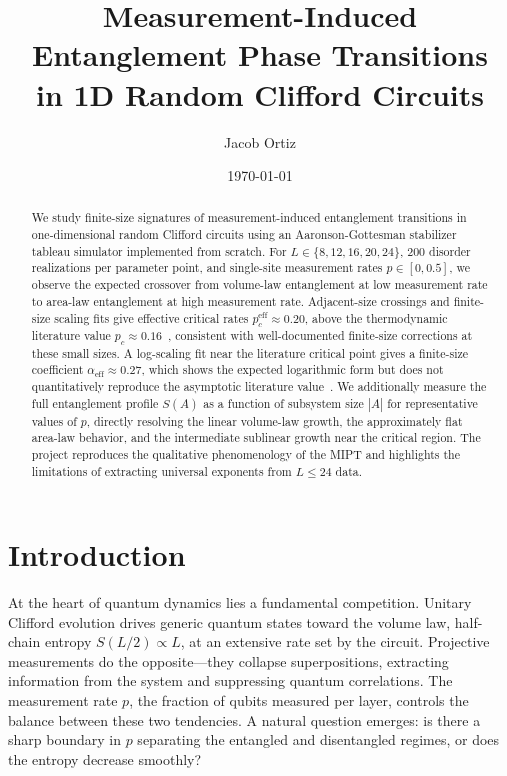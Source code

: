 \documentclass[twocolumn,prl,aps,floatfix]{revtex4-2}
\begin{document}
\title{Measurement-Induced Entanglement Phase Transitions\\
       in 1D Random Clifford Circuits}
\author{Jacob Ortiz}
\date{\today}

\begin{abstract}
We study finite-size signatures of measurement-induced entanglement transitions
in one-dimensional random Clifford circuits using an Aaronson-Gottesman
stabilizer tableau simulator implemented from scratch.
For $L \in \{8,12,16,20,24\}$, 200 disorder realizations per parameter point,
and single-site measurement rates $p \in [0, 0.5]$, we observe the expected
crossover from volume-law entanglement at low measurement rate to area-law
entanglement at high measurement rate.
Adjacent-size crossings and finite-size scaling fits give effective critical
rates $p_c^{\mathrm{eff}} \approx 0.20$, above the thermodynamic literature
value $p_c \approx 0.16$~\cite{Li2019}, consistent with well-documented
finite-size corrections at these small sizes.
A log-scaling fit near the literature critical point gives a finite-size
coefficient $\alpha_{\mathrm{eff}} \approx 0.27$, which shows the expected
logarithmic form but does not quantitatively reproduce the asymptotic
literature value~\cite{Li2019}.
We additionally measure the full entanglement profile $S(A)$ as a function of
subsystem size $|A|$ for representative values of $p$, directly resolving
the linear volume-law growth, the approximately flat area-law behavior, and
the intermediate sublinear growth near the critical region.
The project reproduces the qualitative phenomenology of the MIPT and
highlights the limitations of extracting universal exponents from $L \leq 24$ data.
\end{abstract}

\maketitle

\section{Introduction}

At the heart of quantum dynamics lies a fundamental competition.
Unitary Clifford evolution drives generic quantum states toward the volume law,
half-chain entropy $S(L/2) \propto L$, at an extensive rate set by the circuit.
Projective measurements do the opposite---they collapse superpositions, extracting
information from the system and suppressing quantum correlations.
The measurement rate $p$, the fraction of qubits measured per layer,
controls the balance between these two tendencies.
A natural question emerges: is there a sharp boundary in $p$ separating
the entangled and disentangled regimes, or does the entropy decrease smoothly?
\end{document}
